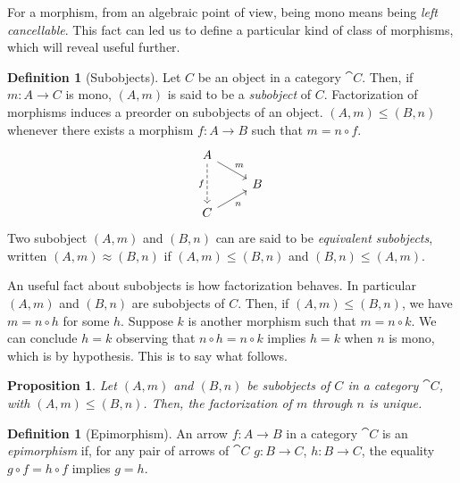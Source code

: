 \documentclass[a4paper, twoside,openright]{report}
\theoremstyle{plain}
\newtheorem{prop}[theorem]{Proposition}
\theoremstyle{definition}
\newtheorem{definition}[theorem]{Definition}
\begin{document}
For a morphism, from an algebraic point of view, being mono means being \emph{left cancellable}. This fact can led us to define a particular kind of class of morphisms, which will reveal useful further. 

\begin{definition}[Subobjects]
    Let $C$ be an object in a category $\cat C$. Then, if $m: A \rightarrow C$ is mono, $(A, m)$ is said to be a \emph{subobject} of $C$. Factorization of morphisms induces a preorder on subobjects of an object. $(A, m) \leq (B, n)$ whenever there exists a morphism $f : A\rightarrow B$ such that $m = n \circ f$.
    \[
        \begin{tikzcd}[row sep=9]
            A \arrow[dr, "m"] \arrow[dd, dashed, "f"swap] & \\
            & B \\
            C \arrow[ur, "n"swap] &
        \end{tikzcd}
    \]
    Two subobject $(A, m)$ and $(B, n)$ can are said to be \emph{equivalent subobjects}, written $(A, m) \approx (B, n)$ if $(A, m)\leq (B, n)$ and $(B, n) \leq (A, m)$. 
\end{definition}

An useful fact about subobjects is how factorization behaves. In particular $(A, m)$ and $(B, n)$ are subobjects of $C$. Then, if $(A, m)\leq (B, n)$, we have $m = n \circ h$ for some $h$. Suppose $k$ is another morphism such that $m = n \circ k$. We can conclude $h = k$ observing that $n \circ h = n \circ k$ implies $h = k$ when $n$ is mono, which is by hypothesis. This is to say what follows.

\begin{prop}\label{prop:fact_of_subobjects_is_unique}
    Let $(A, m)$ and $(B, n)$ be subobjects of $C$ in a category $\cat C$, with $(A, m)\leq (B, n)$. Then, the factorization of $m$ through $n$ is unique.
\end{prop}


\begin{definition}[Epimorphism]\label{def:epi}
    An arrow $f: A\rightarrow B$ in a category $\cat{C}$ is an \emph{epimorphism} if, for any pair of arrows of $\cat{C}$ $g : B \rightarrow C$, $h: B \rightarrow C$, the equality $g \circ f = h \circ f$ implies $g = h$.
\end{definition}
\end{document}
